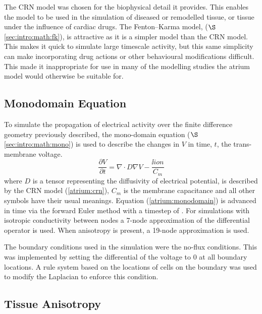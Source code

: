 The CRN model was chosen for the biophysical detail it provides.
This enables the model to be used in the simulation of diseased or remodelled tissue, or
tissue under the influence of cardiac drugs.
The Fenton--Karma model, ($\S$\ref{sec:intro:math:fk}), is attractive as it is a
simpler model than the CRN model.
This makes it quick to simulate large timescale activity, but this same
simplicity can make incorporating drug actions or other behavioural
modifications difficult.
This made it inappropriate for use in many of the modelling studies the atrium
model would otherwise be suitable for.


\subsection{Monodomain Equation}

To simulate the propagation of electrical activity over the finite difference
geometry previously described, the mono-domain equation
($\S$\ref{sec:intro:math:mono}) is used to describe the
changes in $V$ in time, $t$, the trans-membrane voltage.
\begin{equation}
\label{atrium:monodomain}
\frac{\partial V}{\partial t} = \nabla\cdot D \nabla V - \frac{\ii{ion}}{C_{m}}
\end{equation}
where $D$ is a tensor representing the diffusivity of electrical potential,  is described by the
CRN model (\ref{atrium:crn}), $C_{m}$ is the membrane capacitance and all other
symbols have their usual meanings.  Equation (\ref{atrium:monodomain}) is
advanced in time via the forward Euler method with a timestep of .  For
simulations with isotropic conductivity between nodes a 7-node approximation of
the differential operator is used.  When anisotropy is present, a 19-node
approximation is used.

The boundary conditions used in the simulation were the no-flux conditions.
This was implemented by setting the differential of the voltage to 0 at all
boundary locations.
A rule system based on the locations of cells on the boundary was used to modify
the Laplacian to enforce this condition.

\subsection{Tissue Anisotropy}

